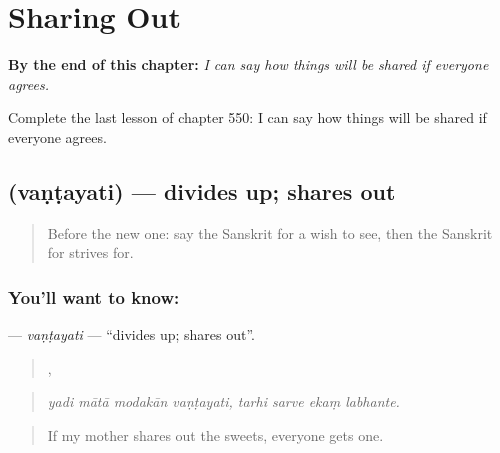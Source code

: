 
\chapter{Sharing Out}
\label{ch:sa-sharing-out}

\begin{chapteropening}
\textbf{By the end of this chapter:} \emph{I can say how things will be shared if everyone agrees.}

Complete the last lesson of chapter 550: I can say how things will be shared if everyone agrees.
\end{chapteropening}

\section[\texorpdfstring{\sk{वण्टयति} (vaṇṭayati)}{वण्टयति (vaṇṭayati)}]{ (vaṇṭayati) — divides up; shares out}

\label{lesson:SA-C550-vantayati}



\begin{quote}
Before the new one: say the Sanskrit for a wish to see, then the Sanskrit for strives for.
\end{quote}

\subsection*{You'll want to know: }
\textbf{} — \emph{vaṇṭayati} — \textquotedblleft{}divides up; shares out\textquotedblright{}.

\begin{quote}
   ,    
\end{quote}

\begin{quote}
\emph{yadi mātā modakān vaṇṭayati, tarhi sarve ekaṃ labhante.}
\end{quote}

\begin{quote}
If my mother shares out the sweets, everyone gets one.
\end{quote}

